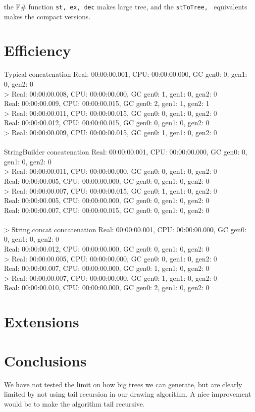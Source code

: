\documentclass[10pt]{scrartcl}
\begin{document}
the F\# function \texttt{st, ex, dec} makes large tree, and the \texttt{stToTree, } equivalents makes the compact versions.
\section{Efficiency}

Typical concatenation
Real: 00:00:00.001, CPU: 00:00:00.000, GC gen0: 0, gen1: 0, gen2: 0\\
> Real: 00:00:00.008, CPU: 00:00:00.000, GC gen0: 1, gen1: 0, gen2: 0\\
Real: 00:00:00.009, CPU: 00:00:00.015, GC gen0: 2, gen1: 1, gen2: 1\\
> Real: 00:00:00.011, CPU: 00:00:00.015, GC gen0: 0, gen1: 0, gen2: 0\\
Real: 00:00:00.012, CPU: 00:00:00.015, GC gen0: 0, gen1: 0, gen2: 0\\
> Real: 00:00:00.009, CPU: 00:00:00.015, GC gen0: 1, gen1: 0, gen2: 0\\\\
StringBuilder concatenation
Real: 00:00:00.001, CPU: 00:00:00.000, GC gen0: 0, gen1: 0, gen2: 0\\
> Real: 00:00:00.011, CPU: 00:00:00.000, GC gen0: 0, gen1: 0, gen2: 0\\
Real: 00:00:00.005, CPU: 00:00:00.000, GC gen0: 0, gen1: 0, gen2: 0\\
> Real: 00:00:00.007, CPU: 00:00:00.015, GC gen0: 1, gen1: 0, gen2: 0\\
Real: 00:00:00.005, CPU: 00:00:00.000, GC gen0: 0, gen1: 0, gen2: 0\\
Real: 00:00:00.007, CPU: 00:00:00.015, GC gen0: 0, gen1: 0, gen2: 0\\\\
> String.concat concatenation
Real: 00:00:00.001, CPU: 00:00:00.000, GC gen0: 0, gen1: 0, gen2: 0\\
Real: 00:00:00.012, CPU: 00:00:00.000, GC gen0: 0, gen1: 0, gen2: 0\\
> Real: 00:00:00.005, CPU: 00:00:00.000, GC gen0: 0, gen1: 0, gen2: 0\\
Real: 00:00:00.007, CPU: 00:00:00.000, GC gen0: 1, gen1: 0, gen2: 0\\
> Real: 00:00:00.007, CPU: 00:00:00.000, GC gen0: 1, gen1: 0, gen2: 0\\
Real: 00:00:00.010, CPU: 00:00:00.000, GC gen0: 2, gen1: 0, gen2: 0\\
\section{Extensions}
\section{Conclusions}
We have not tested the limit on how big trees we can generate, but are clearly limited by not using tail recursion in our drawing algorithm. A nice improvement would be to make the algorithm tail recursive.



\end{document}
